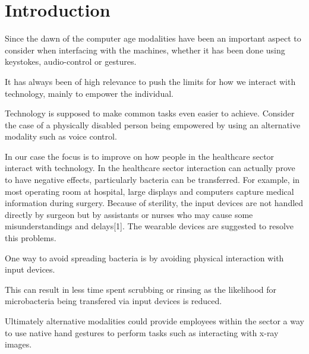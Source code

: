 \section{Introduction}
Since the dawn of the computer age modalities have been an important aspect
to consider when interfacing with the machines, whether it has been done using keystokes, audio-control or gestures.

It has always been of high relevance to push the limits for how we interact with technology, mainly to empower the individual.

Technology is supposed to make common tasks even easier to achieve. Consider the case of a physically disabled person being empowered by using an alternative modality such as voice control.

In our case the focus is to improve on how people in the healthcare sector interact with technology.
In the healthcare sector interaction can actually prove to have negative effects, particularly bacteria can be transferred.
For example, in most operating room at hospital, large displays and computers capture medical information during surgery. Because of sterility, the input devices are not handled directly by surgeon but by assistants or nurses who may cause some misunderstandings and delays[1]. The wearable devices are suggested to resolve this problems.

One way to avoid spreading bacteria is by avoiding physical interaction with input devices.

This can result in less time spent scrubbing or rinsing as the likelihood for microbacteria being 
transfered via input devices is reduced.


Ultimately alternative modalities could provide employees within the sector a 
way to use native hand gestures to perform tasks such as interacting with x-ray images.
